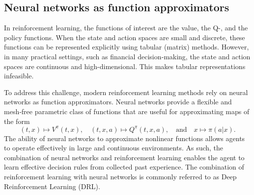 \subsection{Neural networks as function approximators}
In reinforcement learning, the functions of interest are the value, the Q-, and the policy functions. When the state and action spaces are small and discrete, these functions can be represented explicitly using tabular (matrix) methods. However, in many practical settings, such as financial decision‑making, the state and action spaces are continuous and high-dimensional. This makes tabular representations infeasible. 

To address this challenge, modern reinforcement learning methods rely on neural networks as function approximators. Neural networks provide a flexible and mesh‑free parametric class of functions that are useful for approximating maps of the form
\begin{equation*}
    (t,x) \mapsto V^\pi(t,x), \quad (t,x,a) \mapsto Q^\pi(t,x,a), \quad \text{and} \quad  x \mapsto \pi(a|x). 
\end{equation*}
The ability of neural networks to approximate nonlinear functions allows agents to operate effectively in large and continuous environments. As such, the combination of neural networks and reinforcement learning enables the agent to learn effective decision rules from collected past experience. The combination of reinforcement learning with neural networks is commonly referred to as Deep Reinforcement Learning (DRL).

